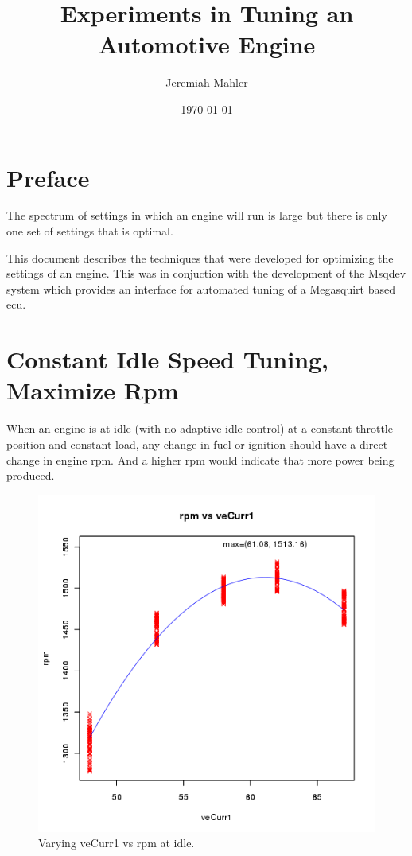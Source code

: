 \documentclass{article}
\begin{document}
\title{Experiments in Tuning an Automotive Engine}
\author{Jeremiah Mahler}
\date{\today}

\maketitle

\tableofcontents

\pagebreak

\section{Preface}

The spectrum of settings in which an engine will run is large
but there is only one set of settings that is optimal.

This document describes the techniques that were developed
for optimizing the settings of an engine.
This was in conjuction with the development of the
Msqdev \cite{MAHL11} system which provides an interface for
automated tuning of a Megasquirt \cite{MEGA11} based ecu.
\nocite{R}

\section{Constant Idle Speed Tuning, Maximize Rpm}

When an engine is at idle (with no adaptive idle control) at a constant
throttle position and constant load, any change in fuel or ignition
should have a direct change in engine rpm.
And a higher rpm would indicate that more power being produced.

\begin{figure}[!hbt]
\center
\includegraphics[scale=0.5]{plot01}
\caption{Varying veCurr1 vs rpm at idle.}
\end{figure}
\end{document}
